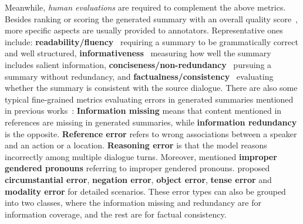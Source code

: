 Meanwhile, \textit{human evaluations} are required to complement the above metrics.
Besides ranking or scoring the generated summary with an overall quality score~\cite{chen2020multi}, 
more specific aspects are usually provided to annotators. Representative ones include:
\textbf{readability/fluency}~\cite{yuan2019scaffolds,zhao2021give} requiring a summary to be grammatically correct and well structured,
\textbf{informativeness}~\cite{feng2020dialogue,lei2021finer,feigenblat-etal-2021-tweetsumm-dialog,feng2021language} measuring how well the summary includes salient information,
\textbf{conciseness/non-redundancy}~\cite{feng2021language,yuan2019scaffolds} pursuing a summary without redundancy,
and \textbf{factualness/consistency}~\cite{feng2020dialogue,zhao2021give,lei2021finer,kim2022mind} evaluating whether the summary is consistent with the source dialogue. There are also some typical fine-grained metrics evaluating errors in generated summaries mentioned in previous works~\cite{chen2020multi,chen2021dialsumm,liu2021coreference}: 
\textbf{Information missing} means that content mentioned in references are missing in generated summaries, while \textbf{information redundancy} is the opposite.
\textbf{Reference error} refers to wrong associations between a speaker and an action or a location.
\textbf{Reasoning error} is that the model reasons incorrectly among multiple dialogue turns.
Moreover, \citet{chen2020multi} mentioned \textbf{improper gendered pronouns} referring to improper gendered pronouns. \citet{tang2021confit} proposed \textbf{circumstantial error}, \textbf{negation error}, \textbf{object error}, \textbf{tense error} and \textbf{modality error} for detailed scenarios. These error types can also be grouped into two classes, where the information missing and redundancy are for information coverage, and the rest are for factual consistency.


